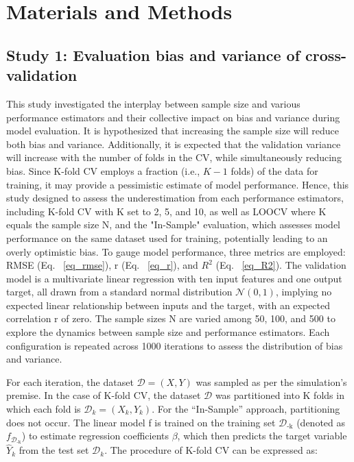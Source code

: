 \section{Materials and Methods}

\subsection{Study 1: Evaluation bias and variance of cross-validation}

This study investigated the interplay between sample size and various performance estimators and their collective impact on bias and variance during model evaluation. It is hypothesized that increasing the sample size will reduce both bias and variance. Additionally, it is expected that the validation variance will increase with the number of folds in the CV, while simultaneously reducing bias. Since K-fold CV employs a fraction (i.e., $K-1$ folds) of the data for training, it may provide a pessimistic estimate of model performance. Hence, this study designed to assess the underestimation from each performance estimators, including K-fold CV with K set to 2, 5, and 10, as well as LOOCV where K equals the sample size N, and the "In-Sample" evaluation, which assesses model performance on the same dataset used for training, potentially leading to an overly optimistic bias. To gauge model performance, three metrics are employed: RMSE (Eq. ~\ref{eq_rmse}), r (Eq. ~\ref{eq_r}), and $R^2$ (Eq. ~\ref{eq_R2}). The validation model is a multivariate linear regression with ten input features and one output target, all drawn from a standard normal distribution $\mathcal{N}(0, 1)$, implying no expected linear relationship between inputs and the target, with an expected correlation r of zero. The sample sizes N are varied among 50, 100, and 500 to explore the dynamics between sample size and performance estimators. Each configuration is repeated across 1000 iterations to assess the distribution of bias and variance.

For each iteration, the dataset $\mathcal{D}={(X, Y)}$ was sampled as per the simulation’s premise. In the case of K-fold CV, the dataset $\mathcal{D}$ was partitioned into K folds in which each fold is $\mathcal{D}_k={(X_k, Y_k)}$. For the “In-Sample” approach, partitioning does not occur. The linear model f is trained on the training set $\mathcal{D}_\text{-k}$ (denoted as $f_{\mathcal{D}_{\text{-k}}}$) to estimate regression coefficients $\beta$, which then predicts the target variable ${\hat{Y}}_k$ from the test set $\mathcal{D}_k$. The procedure of K-fold CV can be expressed as:


